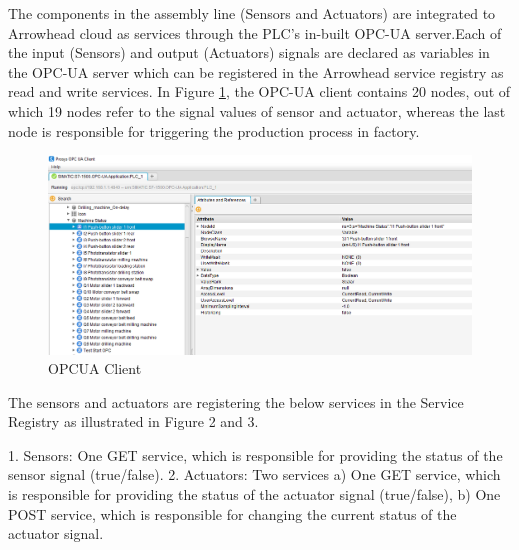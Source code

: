 
The components in the assembly line (Sensors and Actuators) are integrated to Arrowhead cloud as services through the PLC's in-built OPC-UA server.Each of the input (Sensors) and output (Actuators) signals are declared as variables in the OPC-UA server which can be registered in the Arrowhead service registry as read and write services. In Figure  \ref{Figure 1.PNG}, the OPC-UA client contains 20 nodes, out of which 19 nodes refer to the signal values of sensor and actuator, whereas the last node is responsible for triggering the production process in factory.
\begin{figure}[h]
\caption{OPCUA Client}
\label{Figure 1.PNG}
\includegraphics[width=12cm]{Documentation/assemblyLine/sections/Images/OPCUA_Variables.PNG}
\end{figure}

  The sensors and actuators are registering the below services in the Service Registry as illustrated in Figure 2 and 3.
  
  1. Sensors: One GET service, which is responsible for providing the status of the sensor signal (true/false).
  2. Actuators: Two services
        a) One GET service, which is responsible for providing the status of the actuator signal (true/false), 
        b) One POST service, which is responsible for changing the current status of the actuator signal.
  
